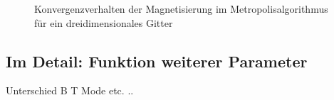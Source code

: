 \begin{figure}[H]
	\centering
	\caption{Konvergenzverhalten der Magnetisierung im Metropolisalgorithmus für ein dreidimensionales Gitter}
	\label{mp3dkonv}
\end{figure}

\subsection{Im Detail: Funktion weiterer Parameter}

Unterschied B T Mode etc. ..